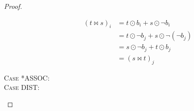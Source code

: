 \begin{proof}
\begin{description}
    \begin{align*}
      (t \bowtie s)_i &= t \odot b_i + s \odot \neg b_i \\
                      &= t \odot \neg b_j + s \odot \neg (\neg b_j) \\
                      &= s \odot \neg b_j + t \odot b_j \\
                      &= (s \bowtie t)_j
    \end{align*}

  \item[\textsc{Case *ASSOC}:]
  \item[\textsc{Case DIST}:]
\end{description}
\end{proof}
